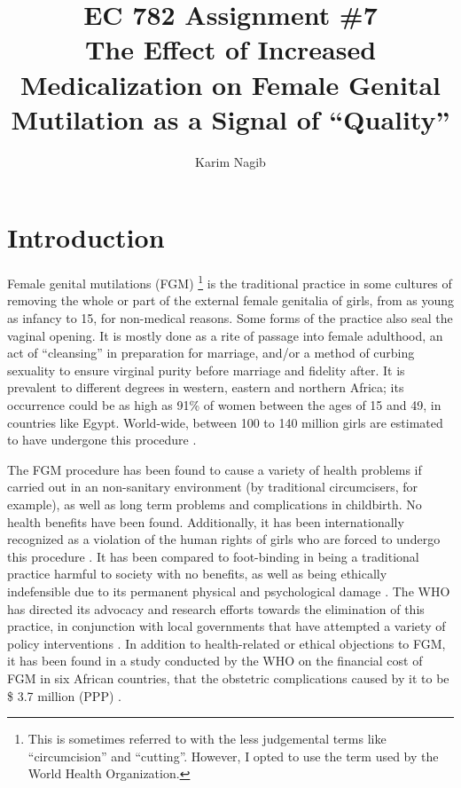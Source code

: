 \documentclass[12pt]{article}
\title{EC 782 Assignment \#7 \\ The Effect of Increased Medicalization on Female Genital Mutilation as a Signal of ``Quality''}
\author{Karim Nagib}
\begin{document}
\maketitle

\section{Introduction}

Female genital mutilations (FGM) \footnote{This is sometimes referred to with the less judgemental terms like ``circumcision'' and ``cutting''. However, I opted to use the term used by the World Health Organization.} is the traditional practice in some cultures of removing the whole or part of the external female genitalia of girls, from as young as infancy to 15, for non-medical reasons. Some forms of the practice also seal the vaginal opening. It is mostly done as a rite of passage into female adulthood, an act of ``cleansing'' in preparation for marriage, and/or a method of curbing sexuality to ensure virginal purity before marriage and fidelity after\cite{whofs241}. It is prevalent to different degrees in western, eastern and northern Africa; its occurrence could be as high as 91\% of women between the ages of 15 and 49, in countries like Egypt\cite{whoprev, El-Zanat}. World-wide, between 100 to 140 million girls are estimated to have undergone this procedure \cite{whofs241}.

The FGM procedure has been found to cause a variety of health problems if carried out in an non-sanitary environment (by traditional circumcisers, for example), as well as long term problems and complications in childbirth.  No health benefits have been found. Additionally, it has been internationally recognized as a violation of the human rights of girls who are forced to undergo this procedure \cite{whofs241}. It has been compared to foot-binding in being a traditional practice harmful to society with no benefits, as well as being ethically indefensible due to its permanent physical and psychological damage \cite{Mackie1996}. The WHO has directed its advocacy and research efforts towards the elimination of this practice, in conjunction with local governments that have attempted a variety of policy interventions \cite{whofs241}. In addition to health-related or ethical objections to FGM, it has been found in a study conducted by the WHO on the financial cost of FGM in six African countries, that the obstetric complications caused by it to be \$ 3.7 million (PPP) \cite{Bishai2010}.
\end{document}
